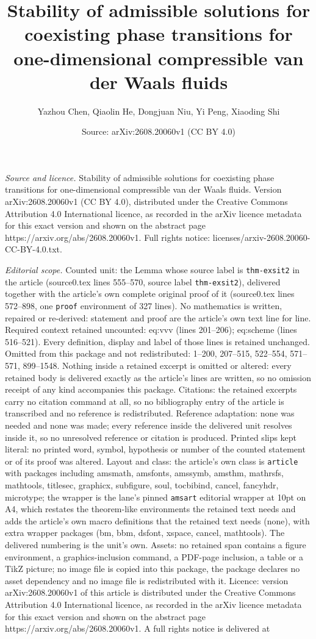 \documentclass[10pt,a4paper]{amsart}
\title[Stability of admissible solutions for coexisting phase trans]{Stability of admissible solutions for coexisting phase transitions for one-dimensional compressible van der Waals fluids}
\author{Yazhou Chen, Qiaolin He, Dongjuan Niu, Yi Peng, Xiaoding Shi}
\date{Source: arXiv:2608.20060v1 (CC BY 4.0)}
\begin{document}
\maketitle

\noindent\emph{Source and licence.} Stability of admissible solutions for coexisting phase transitions for one-dimensional compressible van der Waals fluids. Version arXiv:2608.20060v1 (CC BY 4.0), distributed under the Creative Commons Attribution 4.0 International licence, as recorded in the arXiv licence metadata for this exact version and shown on the abstract page https://arxiv.org/abs/2608.20060v1. Full rights notice: licenses/arxiv-2608.20060-CC-BY-4.0.txt.\par\smallskip

\noindent\textit{Editorial scope.} Counted unit: the Lemma whose source label is \texttt{thm-exsit2} in the article (source0.tex lines 555--570, source label \texttt{thm-exsit2}), delivered together with the article's own complete original proof of it (source0.tex lines 572--898, one \texttt{proof} environment of 327 lines). No mathematics is written, repaired or re-derived: statement and proof are the article's own text line for line. Required context retained uncounted: eq:vvv (lines 201--206); eq:scheme (lines 516--521). Every definition, display and label of those lines is retained unchanged. Omitted from this package and not redistributed: 1--200, 207--515, 522--554, 571--571, 899--1548. Nothing inside a retained excerpt is omitted or altered: every retained body is delivered exactly as the article's lines are written, so no omission receipt of any kind accompanies this package. Citations: the retained excerpts carry no citation command at all, so no bibliography entry of the article is transcribed and no reference is redistributed. Reference adaptation: none was needed and none was made; every reference inside the delivered unit resolves inside it, so no unresolved reference or citation is produced. Printed slips kept literal: no printed word, symbol, hypothesis or number of the counted statement or of its proof was altered. Layout and class: the article's own class is \texttt{article} with packages including amsmath, amsfonts, amssymb, amsthm, mathrsfs, mathtools, titlesec, graphicx, subfigure, soul, tocbibind, cancel, fancyhdr, microtype; the wrapper is the lane's pinned \texttt{amsart} editorial wrapper at 10pt on A4, which restates the theorem-like environments the retained text needs and adds the article's own macro definitions that the retained text needs (none), with extra wrapper packages (bm, bbm, dsfont, xspace, cancel, mathtools). The delivered numbering is the unit's own. Assets: no retained span contains a figure environment, a graphics-inclusion command, a PDF-page inclusion, a table or a TikZ picture; no image file is copied into this package, the package declares no asset dependency and no image file is redistributed with it. Licence: version arXiv:2608.20060v1 of this article is distributed under the Creative Commons Attribution 4.0 International licence, as recorded in the arXiv licence metadata for this exact version and shown on the abstract page https://arxiv.org/abs/2608.20060v1. A full rights notice is delivered at 
\end{document}
